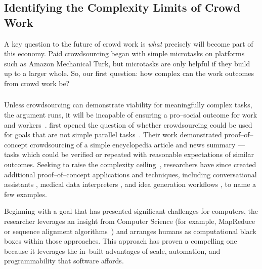 \documentclass[trackingWork]{subfiles}
\begin{document}
\begin{comment}
Crowdwork
  - Kittur said let's do complex stuff
  - This works by using CS techniques
  - Clear that this works in focused cases
  - More recent shift toward using experts
\end{comment}

\subsection[What are the complexity limits of crowd work]
{Identifying the Complexity Limits of Crowd Work}\label{sec:complexity}
A key question to the future of crowd work is
\textit{what} precisely will become part of this economy.
Paid crowdsourcing began with simple microtasks on platforms such as
Amazon Mechanical Turk, but
microtasks are only helpful if they build up to a larger whole.
So, our first question:
how complex can the work outcomes from crowd work be?

\subsubsection{\crowdworkpers}

Unless crowdsourcing can demonstrate viability for meaningfully complex tasks,
the argument runs,
it will be incapable of ensuring a pro--social outcome for work and workers~\cite{crowdworkFuture}.
\citeauthor{crowdForgeKittur} first opened the question of
whether crowdsourcing could be used for goals that are not simple parallel tasks~\cite{crowdForgeKittur}.
Their work demonstrated proof--of--concept crowdsourcing of
a simple encyclopedia article and news summary
--- tasks which could be verified or repeated
with reasonable expectations of similar outcomes.
Seeking to raise the complexity ceiling~\cite{myers2000past},
researchers have since created
additional proof--of--concept applications and techniques,
including conversational assistants \cite{lasecki2013chorus},
medical data interpreters \cite{lasecki2013chorus}, and
idea generation workflows \cite{YuEncouragingOutside,yu2014distributed,Yu2016a},
to name a few examples.

Beginning with a goal that has
presented significant challenges for computers,
the researcher leverages an insight from Computer Science
(for example, MapReduce~\cite{crowdForgeKittur} or
sequence alignment algorithms~\cite{lasecki2012real})
and arranges humans as computational black boxes within those approaches.
This approach has proven a compelling one because
it leverages the in--built advantages of
scale,
automation, and
programmability that software affords.
\end{document}
